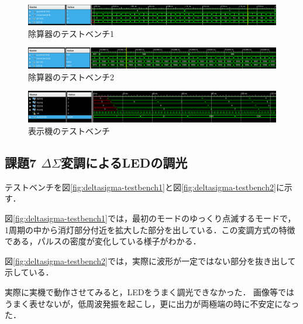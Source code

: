 \begin{figure}[tbp]
  \includegraphics[angle=0,width=160mm]{week4/pics/div10-begin-testbench.png}
  \centering
  \caption{除算器のテストベンチ1} %
  \label{fig:div-testbench1} %
\end{figure}
\begin{figure}[tbp]
  \includegraphics[angle=0,width=160mm]{week4/pics/div10-testbench.png}
  \centering
  \caption{除算器のテストベンチ2} %
  \label{fig:div-testbench2} %
\end{figure}
\begin{figure}[tbp]
  \includegraphics[angle=0,width=160mm]{week4/pics/10000decode.png}
  \centering
  \caption{表示機のテストベンチ} %
  \label{fig:display-testbench} %
\end{figure}


\subsection{課題7 $\Delta\Sigma$変調によるLEDの調光}
テストベンチを図\ref{fig:deltasigma-testbench1}と図\ref{fig:deltasigma-testbench2}に示す．

図\ref{fig:deltasigma-testbench1}では，最初のモードのゆっくり点滅するモードで，1周期の中から消灯部分付近を拡大した部分を出している．この変調方式の特徴である，パルスの密度が変化している様子がわかる．

図\ref{fig:deltasigma-testbench2}では，実際に波形が一定ではない部分を抜き出して示している．

実際に実機で動作させてみると，LEDをうまく調光できなかった．
画像等ではうまく表せないが，低周波発振を起こし，更に出力が両極端の時に不安定になった．

